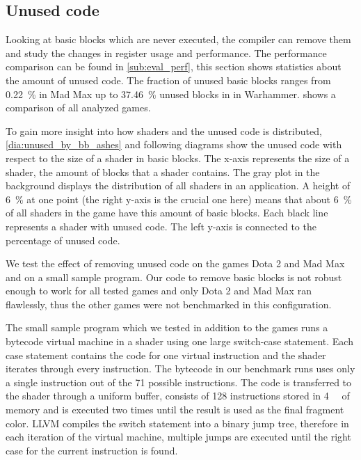 \subsection{Unused code}
\label{sub:eval_unused}
Looking at basic blocks which are never executed, the compiler can remove them and study the changes in register usage and performance.
The performance comparison can be found in \cref{sub:eval_perf}, this section shows statistics about the amount of unused code.
The fraction of unused basic blocks ranges from \SI{0.22}{\percent} in Mad Max up to \SI{37.46}{\percent} unused blocks in in Warhammer.
 shows a comparison of all analyzed games.


To gain more insight into how shaders and the unused code is distributed, \cref{dia:unused_by_bb_ashes} and following diagrams show the unused code with respect to the size of a shader in basic blocks.
The x-axis represents the size of a shader, the amount of blocks that a shader contains.
The gray plot in the background displays the distribution of all shaders in an application.
A height of \SI{6}{\percent} at one point (the right y-axis is the crucial one here) means that about \SI{6}{\percent} of all shaders in the game have this amount of basic blocks.
Each black line represents a shader with unused code. The left y-axis is connected to the percentage of unused code.


We test the effect of removing unused code on the games Dota 2 and Mad Max and on a small sample program.
Our code to remove basic blocks is not robust enough to work for all tested games and only Dota 2 and Mad Max ran flawlessly, thus the other games were not benchmarked in this configuration.

The small sample program which we tested in addition to the games runs a bytecode virtual machine in a shader using one large switch-case statement.
Each case statement contains the code for one virtual instruction and the shader iterates through every instruction.
The bytecode in our benchmark runs uses only a single instruction out of the 71 possible instructions.
The code is transferred to the shader through a uniform buffer, consists of 128 instructions stored in \SI{4}{\kibi\byte} of memory and is executed two times until the result is used as the final fragment color.
LLVM compiles the switch statement into a binary jump tree, therefore in each iteration of the virtual machine, multiple jumps are executed until the right case for the current instruction is found.

